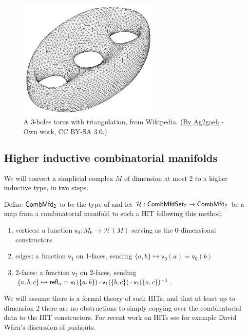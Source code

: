 \begin{figure}[htbp]
\centering
\includegraphics[width=200pt]{triangulated_genus3.pdf}
\caption{A 3-holes torus with triangulation, from Wikipedia. (\href{https://commons.wikimedia.org/wiki/File:Tri-brezel.svg}{By Ag2gaeh} - Own work, CC BY-SA 3.0.)}
\label{fig:genus3_wiki_triangulation}
\end{figure}

\subsection{Higher inductive combinatorial manifolds}

We will convert a simplicial complex \( M \) of dimension at most 2 to a higher inductive type, in two steps. 

\begin{mydef}
Define \( \mathsf{CombMfd_2} \) to be the type of  and let \( \mathcal{H}:\mathsf{CombMfdSet_2}\to\mathsf{CombMfd_2} \) be a map from a combinatorial manifold to such a HIT following this method:
\begin{enumerate}
\item vertices: a function \( \mathsf{v_0}:M_0\to \mathcal{H}(M) \) serving as the 0-dimensional constructors
\item edges: a function \( \mathsf{v_1} \) on 1-faces, sending \( \{a, b\}\mapsto \mathsf{v_0}(a)=\mathsf{v_0}(b) \)
\item 2-faces: a function \( \mathsf{v_2} \) on 2-faces, sending \( \{a, b, c\}\mapsto \mathsf{refl}_a = \mathsf{v_1}(\{a, b\})\cdot \mathsf{v_1}(\{b, c\})\cdot \mathsf{v_1}(\{a, c\})^{-1} \).
\end{enumerate}
\end{mydef}

We will assume there is a formal theory of such HITs, and that at least up to dimension 2 there are no obstructions to simply copying over the combinatorial data to the HIT constructors. For recent work on HITs see for example David Wärn's discussion of pushouts\cite{warn_pushouts}.


